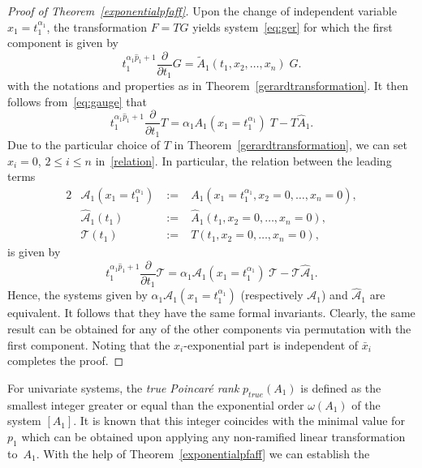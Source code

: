 \documentclass[final,1p,times,number,amsthm]{elsart}
\newcommand{\pder}[2]{\frac{\partial}{\partial #2}#1}
\begin{document}
\begin{proof}[Proof of Theorem~\ref{exponentialpfaff}] Upon the change of
  independent variable $x_1=t_1^{\alpha_1}$, the transformation $F = T G$ yields
  system~\eqref{eq:ger} for which the first component is given by
\begin{equation*}
t_1^{\alpha_1 \hat{p}_1 + 1} \pder{G}{t_1} = \tilde{A}_{1}(t_1, x_2, \dots, x_n)  \; G.
\end{equation*}
with the notations and properties as in Theorem~\ref{gerardtransformation}. It
then follows from~\eqref{eq:gauge} that
\begin{equation}
\label{relation}
t_1^{\alpha_1 {\hat{p}}_1 + 1}\pder{T}{t_1}= \alpha_1
A_{1}(x_1=t_1^{\alpha_1})\; T - T {\hat{A}}_{1}.
\end{equation}
Due to the particular choice of $T$ in Theorem~\ref{gerardtransformation}, we
can set $x_i=0$, $2 \leq i \leq n$ in~\eqref{relation}. In particular, the
relation between the leading terms
\begin{alignat*}2 &\mathcal{A}_{1}(x_1=t_1^{\alpha_1}) &\;:=\; &A_{1} (x_1 =
  t_1^{\alpha_1}, x_2=0,\dots,x_n=0),\\ &\hat{\mathcal{A}}_{1} (t_1) &\; :=
  \;&\hat{A}_{1} (t_1, x_2=0, \dots, x_n=0),\\ &\mathcal{T} (t_1) &\; :=
  \;&T(t_1, x_2=0,\dots,x_n=0),
\end{alignat*}
is given by
\begin{equation*}
  t_1^{\alpha_1 \hat{p}_1 + 1} \pder{\mathcal{T}}{t_1} = \alpha_1
{\mathcal{A}}_{1}(x_1=t_1^{\alpha_1})\; \mathcal{T} - \mathcal{T}
{\hat{\mathcal{A}}}_{1}.
\end{equation*}
Hence, the systems given by $\alpha_1{\mathcal{A}}_{1}(x_1=t_1^{\alpha_1})$
(respectively ${\mathcal{A}}_{1}$) and ${\hat{\mathcal{A}}}_{1}$ are
equivalent. It follows that they have the same formal invariants.  Clearly, the
same result can be obtained for any of the other components via permutation with
the first component. Noting that the $x_i$-exponential part is independent of
$\bar{x}_i$ completes the proof.
 \end{proof}
 For univariate systems, the \textit{true Poincar\'e rank} $p_{true}(A_1)$ is
 defined as the smallest integer greater or equal than the exponential order  $\omega(A_1)$ of 
 the system $[A_1]$. It is known that this integer coincides with the minimal value for
 $p_1$ which can be obtained upon applying any  non-ramified linear transformation 
 to~$A_1$. With the help of Theorem~\ref{exponentialpfaff} we can establish the
\end{document}
